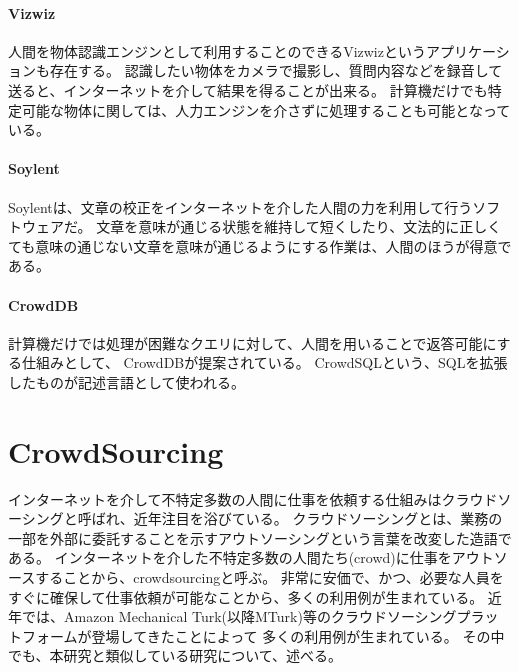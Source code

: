 \paragraph{Vizwiz}\label{vizwiz}

\mbox{}

人間を物体認識エンジンとして利用することのできるVizwiz\cite{vizwiz}というアプリケーションも存在する。
認識したい物体をカメラで撮影し、質問内容などを録音して送ると、インターネットを介して結果を得ることが出来る。
計算機だけでも特定可能な物体に関しては、人力エンジンを介さずに処理することも可能となっている。

\paragraph{Soylent}\label{soylent}

\mbox{}

Soylent\cite{soylent}は、文章の校正をインターネットを介した人間の力を利用して行うソフトウェアだ。
文章を意味が通じる状態を維持して短くしたり、文法的に正しくても意味の通じない文章を意味が通じるようにする作業は、人間のほうが得意である。

\paragraph{CrowdDB}\label{crowddb}

\mbox{}

計算機だけでは処理が困難なクエリに対して、人間を用いることで返答可能にする仕組みとして、
CrowdDB\cite{crowddb}が提案されている。
CrowdSQLという、SQLを拡張したものが記述言語として使われる。

\section{CrowdSourcing}\label{crowdsourcing}

インターネットを介して不特定多数の人間に仕事を依頼する仕組みはクラウドソーシングと呼ばれ、近年注目を浴びている。
クラウドソーシングとは、業務の一部を外部に委託することを示すアウトソーシングという言葉を改変した造語である\cite{riseofcrowdsourcing}。
インターネットを介した不特定多数の人間たち(crowd)に仕事をアウトソースすることから、crowdsourcingと呼ぶ。
非常に安価で、かつ、必要な人員をすぐに確保して仕事依頼が可能なことから、多くの利用例が生まれている。
近年では、Amazon Mechanical
Turk\cite{amt}(以降MTurk)等のクラウドソーシングプラットフォームが登場してきたことによって
多くの利用例が生まれている。
その中でも、本研究と類似している研究について、述べる。


